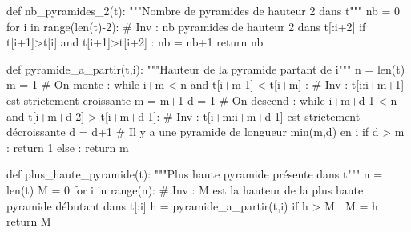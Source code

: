 \question{} 
\begin{pyverbatim}
def nb_pyramides_2(t):
    """Nombre de pyramides de hauteur 2 dans t"""
    nb = 0
    for i in range(len(t)-2):
        # Inv : nb pyramides de hauteur 2 dans t[:i+2]
        if t[i+1]>t[i] and t[i+1]>t[i+2] :
            nb = nb+1
    return nb
\end{pyverbatim}

\question{}
\begin{pyverbatim}
def pyramide_a_partir(t,i):
    """Hauteur de la pyramide partant de i"""
    n = len(t)
    m = 1
    # On monte :
    while i+m < n and t[i+m-1] < t[i+m] :
        # Inv : t[i:i+m+1] est strictement croissante
        m = m+1
    d = 1
    # On descend :
    while i+m+d-1 < n and t[i+m+d-2] > t[i+m+d-1]:
        # Inv : t[i+m:i+m+d-1] est strictement décroissante
        d = d+1
    # Il y a une pyramide de longueur min(m,d) en i
    if d > m : 
        return 1
    else :
        return m
\end{pyverbatim}

\question{} 
\begin{pyverbatim}
def plus_haute_pyramide(t):
    """Plus haute pyramide présente dans t"""
    n = len(t)
    M = 0
    for i in range(n):
        # Inv : M est la hauteur de la plus haute pyramide débutant dans t[:i]
        h = pyramide_a_partir(t,i)
        if h > M :
            M = h
    return M
\end{pyverbatim}


